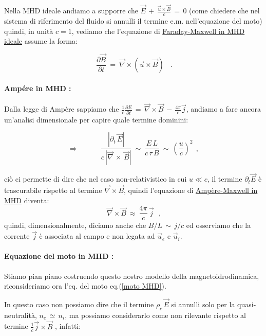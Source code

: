 Nella MHD ideale andiamo a supporre che $\vec E\, +\, \frac{\vec u\times \vec B}{c}\, =\, 0$ (come chiedere che nel sistema di riferimento del fluido si annulli il termine e.m. nell'equazione del moto) quindi, in unità $c=1$, vediamo che l'equazione di \underline{Faraday-Maxwell in MHD ideale} assume la forma:

\begin{equation}
	\label{Faraday MHD ideale}
	\boxed{\ \frac{\partial \vec B}{\partial t}\ =\ \vec \nabla \times \left(\vec u\times \vec B\right)\ }\ \ \ .
\end{equation}

%
%
\vspace{0.5cm}
\paragraph{Ampére in MHD : } 

Dalla legge di Ampère sappiamo che $\frac{1}{c}\frac{\partial E}{\partial t}\, =\, \vec \nabla \times \vec B\, -\, \frac{4\pi}{c} \vec j$, andiamo a fare ancora un'analisi dimensionale per capire quale termine dominini:

\[ \Rightarrow\qquad\quad \frac{|\partial_t\, \vec E|}{c\,|\vec \nabla\, \times\, \vec B|}\ \sim\ \frac{E\, L}{c\, \tau\, B}\ \sim\ \left( \frac{u}{c}\right)^2\ \ , \]

ciò ci permette di dire che nel caso non-relativistico in cui $u\ll c$, il termine $\partial_t \vec E$ è trascurabile rispetto al termine $\vec \nabla \times\vec B$, quindi l'equazione di \underline{Ampère-Maxwell in MHD} diventa: 
\begin{equation}
	\label{Ampére MHD}
	\boxed{\ \vec \nabla\times \vec B\ \approx\ \frac{4\pi}{c}\,\vec j\ }\ \ ,
\end{equation}
quindi, dimensionalmente, diciamo anche che $B/L\, \sim\, j / c$ ed osserviamo che la corrente $\vec j$ è associata al campo e non legata ad $\vec u_e$ e $\vec u_i$.

%
%
\vspace{0.5cm}
\paragraph{Equazione del moto in MHD : } 
Stiamo pian piano costruendo questo nostro modello della magnetoidrodinamica, riconsideriamo ora l'eq. del moto eq.(\ref{moto MHD}). 

In questo caso non possiamo dire che il termine $\rho_c\, \vec E$ si annulli solo per la quasi-neutralità, $n_e\, \simeq\, n_i$, ma possiamo considerarlo come non rilevante rispetto al termine $\frac{1}{c} \vec j\times \vec B$ , infatti:

